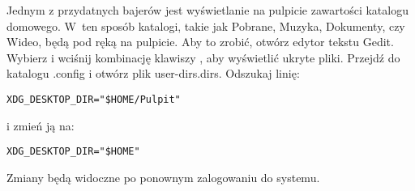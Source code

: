 Jednym z przydatnych bajerów jest wyświetlanie na pulpicie zawartości katalogu domowego. W~ten sposób katalogi, takie jak Pobrane, Muzyka, Dokumenty, czy Wideo, będą pod ręką na pulpicie. Aby to zrobić, otwórz edytor tekstu Gedit. Wybierz  i wciśnij kombinację klawiszy , aby wyświetlić ukryte pliki. Przejdź do katalogu .config i otwórz plik \textcolor{ubuntu_orange}{user-dirs.dirs}. Odszukaj linię:
\begin{lstlisting}
XDG_DESKTOP_DIR="$HOME/Pulpit"
\end{lstlisting}
i zmień ją na:
\begin{lstlisting}
XDG_DESKTOP_DIR="$HOME"
\end{lstlisting}

Zmiany będą widoczne po ponownym zalogowaniu do systemu.
